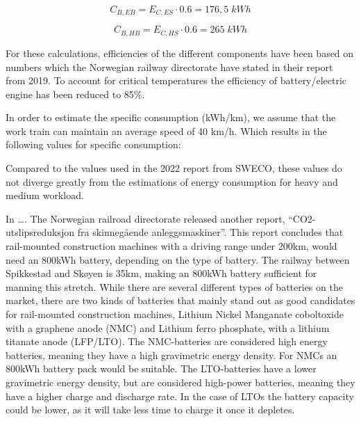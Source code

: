\documentclass{article}
\begin{document}
\begin{equation*}
    C_{B, EB} = E_{C,ES}\cdot 0.6 = 176,5\;kWh
\end{equation*}

\begin{equation*}
    C_{B, HB} = E_{C,HS}\cdot 0.6 = 265\;kWh
\end{equation*}

For these calculations, efficiencies of the different components have been based on numbers which the Norwegian railway directorate have stated in their report from 2019. To account for critical temperatures the efficiency of battery/electric engine has been reduced to 85\%.

In order to estimate the specific consumption (kWh/km), we assume that the work train can maintain an average speed of 40 km/h. Which results in the following values for specific consumption:

\begin{table}[H]
\end{table}

Compared to the values used in the 2022 report from SWECO, these values do not diverge greatly from the estimations of energy consumption for heavy and medium workload.

In …. The Norwegian railroad directorate released another report, “CO2-utslipsreduksjon fra skinnegående anleggsmaskiner”. This report concludes that rail-mounted construction machines with a driving range under 200km, would need an 800kWh battery, depending on the type of battery. The railway between Spikkestad and Skøyen is 35km, making an 800kWh battery sufficient for manning this stretch. While there are several different types of batteries on the market, there are two kinds of batteries that mainly stand out as good candidates for rail-mounted construction machines, Lithium Nickel Manganate coboltoxide with a graphene anode (NMC) and Lithium ferro phosphate, with a lithium titanate anode (LFP/LTO). The NMC-batteries are considered high energy batteries, meaning they have a high gravimetric energy density. For NMCs an 800kWh battery pack would be suitable. The LTO-batteries have a lower gravimetric energy density, but are considered high-power batteries, meaning they have a higher charge and discharge rate. In the case of LTOs the battery capacity could be lower, as it will take less time to charge it once it depletes.
\end{document}
